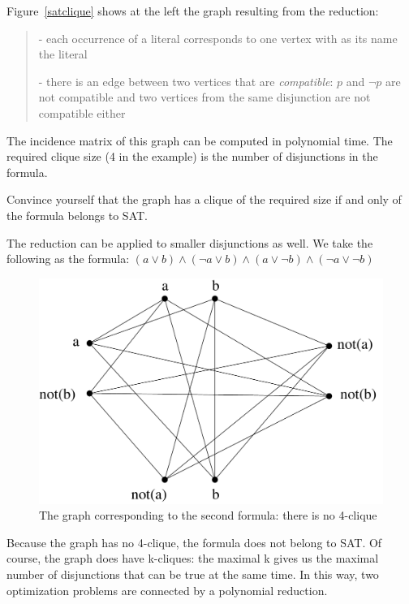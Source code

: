 \begin{vb}
Figure~\ref{satclique} shows at the left the graph resulting from the
reduction:
\begin{verse}
- each occurrence of a literal corresponds to one vertex with as its
name the literal

- there is an edge between two vertices that are {\em compatible}: $p$
and $\neg p$ are not compatible and two vertices from the same
disjunction are not compatible either
\end{verse}

The incidence matrix of this graph can be computed in polynomial
time. The required clique size (4 in the example) is the number of
disjunctions in the formula.
\end{vb}

Convince yourself that the graph has a clique of the required size if
and only of the formula belongs to SAT.


\begin{vb}
The reduction can be applied to smaller disjunctions as well. We take the following
as the formula: $(a \vee b) \wedge (\neg a \vee b) \wedge (a \vee \neg b)
\wedge (\neg a \vee \neg b)$


\begin{figure}[h]
\begin{center}
\includegraphics[height=0.2\textheight,keepaspectratio]{satclique2}
\caption{The graph corresponding to the second formula: there is no
4-clique}\label{satclique2}
\end{center}
\end{figure}

Because the graph has no 4-clique, the formula does not belong to
SAT. Of course, the graph does have k-cliques: the maximal k gives us
the maximal number of disjunctions that can be true at the same
time. In this way, two optimization problems are connected by a
polynomial reduction.

\end{vb}

